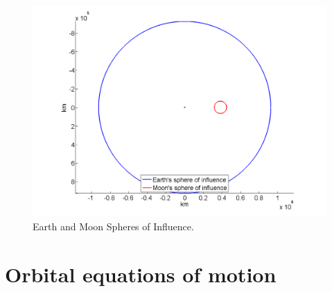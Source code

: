 \begin{figure} [h]
\caption{Earth and Moon Spheres of Influence.}
\label{fig:Spheres-of-Influence}
\centering
\includegraphics[scale=0.4]{Images/Spheres-of-Influence.png}
\end{figure}




\section{Orbital equations of motion} \label{sec:Orbital-equations-of-motion}

